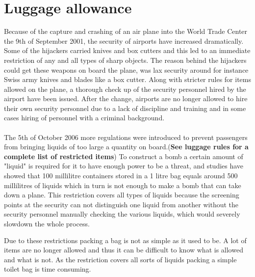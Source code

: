 \section{Luggage allowance}

Because of the capture and crashing of an air plane into the World Trade Center the 9th of September 2001, the security of airports have increased dramatically. Some of the hijackers carried knives and box cutters and this led to an immediate restriction of any and all types of sharp objects. The reason behind the hijackers could get these weapons on board the plane, was lax security around for instance Swiss army knives and blades like a box cutter. Along with stricter rules for items allowed on the plane, a thorough check up of the security personnel hired by the airport have been issued. After the change, airports are no longer allowed to hire their own security personnel due to a lack of discipline and training and in some cases hiring of personnel with a criminal background.\citep{Stricter_rules}\\
\\
The 5th of October 2006 more regulations were introduced to prevent passengers from bringing liquids of too large a quantity on board.(\textbf{See luggage rules for a complete list of restricted items}) To construct a bomb a certain amount of "liquid" is required for it to have enough power to be a threat, and studies have showed that 100 millilitre containers stored in a 1 litre bag equals around 500 millilitres of liquids which in turn is not enough to make a bomb that can take down a plane. This restriction covers all types of liquids because the screening points at the security can not distinguish one liquid from another without the security personnel manually checking the various liquids, which would severely slowdown the whole process.\citep{Why_rules}\newline

Due to these restrictions packing a bag is not as simple as it used to be. A lot of items are no longer allowed and thus it can be difficult to know what is allowed and what is not. As the restriction covers all sorts of liquids packing a simple toilet bag is time consuming.